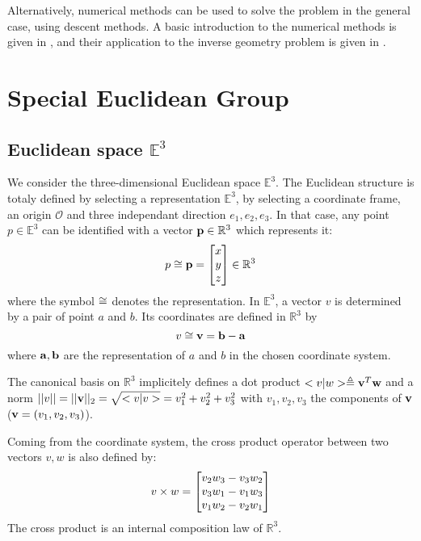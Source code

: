 \documentclass{book}
\begin{document}
Alternatively, numerical methods can be used to solve the problem in the general case, using descent methods. A basic introduction to the numerical methods is given in , and their application to the inverse geometry problem is given in .

\section{Special Euclidean Group} \label{sec:se3}

\subsection{Euclidean space $\mathbb{E}^3$}

We consider the three-dimensional Euclidean space  $\mathbb{E}^3$. The Euclidean structure is totaly defined by selecting a representation $\mathbb{E}^3$, by selecting a coordinate frame, \mie an origin $\mathcal{O}$ and three independant direction $e_1,e_2,e_3$. In that case, any point $p \in \mathbb{E}^3$ can be identified with a vector $\mathbf{p} \in \mathbb{R}^3$ which represents it:
\[ p \cong \mathbf{p} = \begin{bmatrix} x \\ y \\ z \end{bmatrix} \in \mathbb{R}^3 \] 
where the symbol $\cong$ denotes the representation. In $\mathbb{E}^3$, a vector $v$ is determined by a pair of point $a$ and $b$. Its coordinates are defined in $\mathbb{R}^3$ by 
\[ v \cong \mathbf{v} = \mathbf{b} - \mathbf{a} \]
where $\mathbf{a},\mathbf{b}$ are the representation of $a$ and $b$ in the chosen coordinate system.

The canonical basis on $\mathbb{R}^3$ implicitely defines a dot product $<v|w> \triangleq \mathbf{v}^T \mathbf{w}$ and a norm $|| v || = || \mathbf{v}||_2 = \sqrt{<v|v>} = v_1^2 + v_2^2 + v_3^2$ with $v_1,v_2,v_3$ the components of $\mathbf{v}$ ($\mathbf{v} = (v_1,v_2,v_3)$).

Coming from the coordinate system, the cross product operator between two vectors $v,w$ is also defined by:
\[ v \times w  = \begin{bmatrix} v_2 w_3 - v_3 w_2 \\ v_3 w_1 - v_1 w_3 \\ v_1 w_2 - v_2 w_1 \end{bmatrix} \]
The cross product is an internal composition law of $\mathbb{R}^3$.
\end{document}

